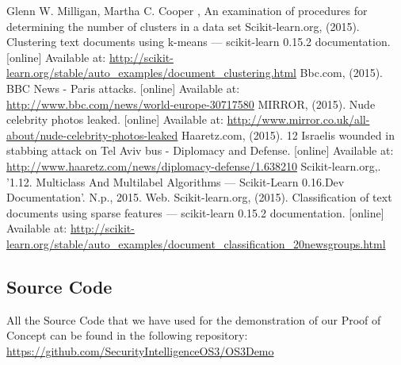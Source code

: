 \documentclass[12pt]{article}
\begin{document}
\begin{thebibliography}{99}
    Glenn W. Milligan, Martha C. Cooper , An examination of procedures for determining the number of clusters in a data set
Scikit-learn.org, (2015). Clustering text documents using k-means — scikit-learn 0.15.2 documentation. [online] Available at: \url{http://scikit-learn.org/stable/auto_examples/document_clustering.html} 
Bbc.com, (2015). BBC News - Paris attacks. [online] Available at: \url{http://www.bbc.com/news/world-europe-30717580} 
MIRROR, (2015). Nude celebrity photos leaked. [online] Available at: \url{http://www.mirror.co.uk/all-about/nude-celebrity-photos-leaked}
 Haaretz.com, (2015). 12 Israelis wounded in stabbing attack on Tel Aviv bus - Diplomacy and Defense. [online] Available at: \url{http://www.haaretz.com/news/diplomacy-defense/1.638210} 
Scikit-learn.org,. '1.12. Multiclass And Multilabel Algorithms — Scikit-Learn 0.16.Dev Documentation'. N.p., 2015. Web. 
Scikit-learn.org, (2015). Classification of text documents using sparse features — scikit-learn 0.15.2 documentation. [online] Available at: \url{http://scikit-learn.org/stable/auto_examples/document_classification_20newsgroups.html} 
\end{thebibliography}
\newpage
\begin{appendices}
\section{Source Code}
All the Source Code that we have used for the demonstration of our Proof of Concept can be found in the following repository:\\
\url{https://github.com/SecurityIntelligenceOS3/OS3Demo}
\end{appendices}
\end{document}
